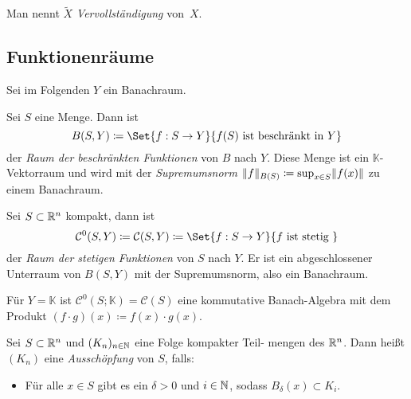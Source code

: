 \documentclass{cheat-sheet}
\newcommand{\K}{\mathbb{K}}
\begin{document}
\begin{defn}
  Man nennt $\widetilde{X}$ \emph{Vervollständigung} von~$X$.
\end{defn}

\subsection{Funktionenräume}

\begin{nota}
  Sei im Folgenden $Y$ ein Banachraum.
\end{nota}

\begin{defn}
  Sei $S$ eine Menge. Dann ist
  \[ B(S, Y) \coloneqq \Set{ f : S \to Y }{ f(S) \text { ist beschränkt in } Y } \]
  der \emph{Raum der beschränkten Funktionen} von $B$ nach $Y$. Diese Menge ist ein $\K$-Vektorraum und wird mit der \emph{Supremumsnorm} $\lVert f\rVert_{B(S)} \coloneqq \sup_{x \in S} \lVert f(x)\rVert$ zu einem Banachraum.
\end{defn}

\begin{defn}
  Sei $S \subset \mathbb{R}^n$ kompakt, dann ist
  \[ \mathcal{C}^0(S, Y) \coloneqq \mathcal{C}(S, Y) \coloneqq \Set{ f : S \to Y }{ f \text{ ist stetig } } \]
  der \emph{Raum der stetigen Funktionen} von $S$ nach $Y$. Er ist ein abgeschlossener Unterraum von $B(S, Y)$ mit der Supremumsnorm, also ein Banachraum.
\end{defn}


\begin{bem}
  Für $Y = \K$ ist $\mathcal{C}^0(S; \K) = \mathcal{C}(S)$ eine kommutative Banach-Algebra mit dem Produkt $(f \cdot g)(x) \coloneqq f(x) \cdot g(x)$.
\end{bem}

\begin{defn}
  Sei $S \subset \mathbb{R}^n$ und $(K_n)_{n \in \mathbb{N}}$ eine Folge kompakter Teil- mengen des $\mathbb{R}^n$. Dann heißt $(K_n)$ eine \emph{Ausschöpfung} von $S$, falls:
  \begin{itemize}
    \item Für alle $x \in S$ gibt es ein $\delta > 0$ und $i \in \mathbb{N}$, sodass $B_\delta(x) \subset K_i$.
    \\[-4pt]
  \end{itemize}
\end{defn}
\end{document}

